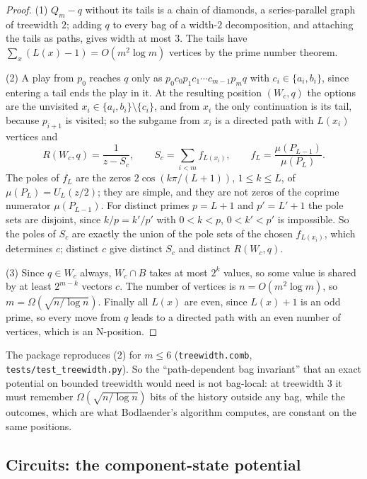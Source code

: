 \documentclass[11pt]{amsart}
\theoremstyle{plain}
\theoremstyle{definition}
\theoremstyle{remark}
\numberwithin{equation}{section}
\newcommand{\code}[1]{{\ttfamily\nolinkurl{#1}}}
\begin{document}
\begin{proof}
(1) $Q_m-q$ without its tails is a chain of diamonds, a series-parallel graph of treewidth $2$; adding $q$ to every bag of a width-$2$ decomposition, and attaching the tails as paths, gives width at most $3$. The tails have $\sum_x(L(x)-1)=O(m^{2}\log m)$ vertices by the prime number theorem.

(2) A play from $p_0$ reaches $q$ only as $p_0c_0p_1c_1\cdots c_{m-1}p_mq$ with $c_i\in\{a_i,b_i\}$, since entering a tail ends the play in it. At the resulting position $(W_c,q)$ the options are the unvisited $x_i\in\{a_i,b_i\}\setminus\{c_i\}$, and from $x_i$ the only continuation is its tail, because $p_{i+1}$ is visited; so the subgame from $x_i$ is a directed path with $L(x_i)$ vertices and
\[
R(W_c,q)=\frac{1}{z-S_c},\qquad S_c=\sum_{i<m}f_{L(x_i)},\qquad f_L=\frac{\mu(P_{L-1})}{\mu(P_L)}.
\]
The poles of $f_L$ are the zeros $2\cos(k\pi/(L+1))$, $1\le k\le L$, of $\mu(P_L)=U_L(z/2)$; they are simple, and they are not zeros of the coprime numerator $\mu(P_{L-1})$. For distinct primes $p=L+1$ and $p'=L'+1$ the pole sets are disjoint, since $k/p=k'/p'$ with $0<k<p$, $0<k'<p'$ is impossible. So the poles of $S_c$ are exactly the union of the pole sets of the chosen $f_{L(x_i)}$, which determines $c$; distinct $c$ give distinct $S_c$ and distinct $R(W_c,q)$.

(3) Since $q\in W_c$ always, $W_c\cap B$ takes at most $2^{k}$ values, so some value is shared by at least $2^{m-k}$ vectors $c$. The number of vertices is $n=O(m^{2}\log m)$, so $m=\Omega(\sqrt{n/\log n})$. Finally all $L(x)$ are even, since $L(x)+1$ is an odd prime, so every move from $q$ leads to a directed path with an even number of vertices, which is an N-position.
\end{proof}

The package reproduces (2) for $m\le6$ (\code{treewidth.comb}, \code{tests/test_treewidth.py}). So the ``path-dependent bag invariant'' that an exact potential on bounded treewidth would need is not bag-local: at treewidth $3$ it must remember $\Omega(\sqrt{n/\log n})$ bits of the history outside any bag, while the outcomes, which are what Bodlaender's algorithm computes, are constant on the same positions.

\subsection{Circuits: the component-state potential}\label{ssec:circuits}
\end{document}
